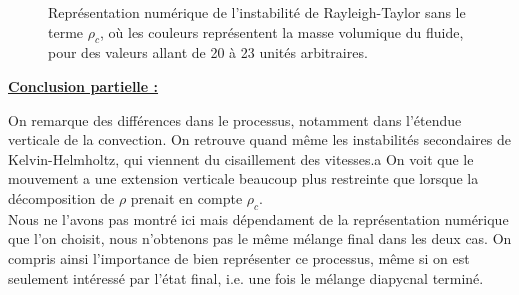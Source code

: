 \documentclass{rapportECC}
\begin{document}
\begin{figure}[H]
    \centering
    \hfill
    \caption{Représentation numérique de l'instabilité de Rayleigh-Taylor sans le terme $\rho_c$, où les couleurs représentent la masse volumique du fluide, pour des valeurs allant de 20 à 23 unités arbitraires.}
    \label{fig:images_cote_a_cote}
\end{figure}
\underline{\textbf{Conclusion partielle :}} \\
\vspace{0.5 cm}

On remarque des différences dans le processus, notamment dans l'étendue verticale de la convection. On retrouve quand même les instabilités secondaires de Kelvin-Helmholtz, qui viennent du cisaillement des vitesses.a    
On voit que le mouvement a une extension verticale beaucoup plus restreinte que lorsque la décomposition de $\rho$ prenait en compte $\rho_c$. \\
Nous ne l'avons pas montré ici mais dépendament de la représentation numérique que l'on choisit, nous n'obtenons pas le même mélange final dans les deux cas. On compris ainsi l'importance de bien représenter ce processus, même si on est seulement intéressé par l'état final, i.e. une fois le mélange diapycnal terminé.
\\
\end{document}
